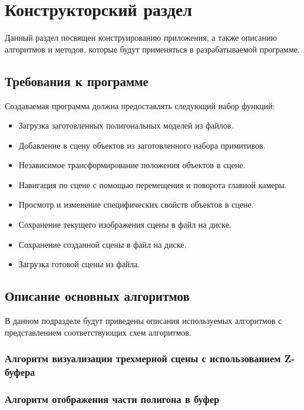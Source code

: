 \chapter{Конструкторский раздел}

Данный раздел посвящен конструированию приложения, а также описанию алгоритмов и методов, которые будут применяться в разрабатываемой программе.

\section{Требования к программе}

Создаваемая программа должна предоставлять следующий набор функций:

\begin{itemize}[$\bullet$]
	\item Загрузка заготовленных полигональных моделей из файлов.
	\item Добавление в сцену объектов из заготовленного набора примитивов.
	\item Независимое трансформирование положения объектов в сцене.
	\item Навигация по сцене с помощью перемещения и поворота главной камеры.
	\item Просмотр и изменение специфических свойств объектов в сцене.
	\item Сохранение текущего изображения сцены в файл на диске.
	\item Сохранение созданной сцены в файл на диске.
	\item Загрузка готовой сцены из файла.
\end{itemize}

\section{Описание основных алгоритмов}

В данном подразделе будут приведены описания используемых алгоритмов с представлением соответствующих схем алгоритмов.

\subsection{Алгоритм визуализации трехмерной сцены с использованием Z-буфера}

\subsection{Алгоритм отображения части полигона в буфер}

